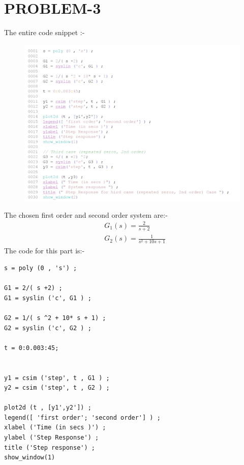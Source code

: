 \documentclass[12pt]{article}
\begin{document}
\section{PROBLEM-3}
The entire code snippet :-
    \begin{figure}[H]
        \centering
        \includegraphics[scale=0.8]{q3_code.png}
    \end{figure}
    The chosen first order and second order system are:-
    \begin{align*}
        & G_1(s) = \frac{2}{s+2} \\
        & G_2(s) = \frac{1}{s^2+10s+1}
    \end{align*}
The code for this part is:-
    \begin{verbatim}
s = poly (0 , 's') ;

G1 = 2/( s +2) ;
G1 = syslin ('c', G1 ) ;

G2 = 1/( s ^2 + 10* s + 1) ;
G2 = syslin ('c', G2 ) ;

t = 0:0.003:45;


y1 = csim ('step', t , G1 ) ;
y2 = csim ('step', t , G2 ) ;

plot2d (t , [y1',y2']) ;
legend([ 'first order'; 'second order'] ) ;
xlabel ('Time (in secs )') ;
ylabel ('Step Response') ;
title ('Step response') ;
show_window(1)
    \end{verbatim}
\end{document}
